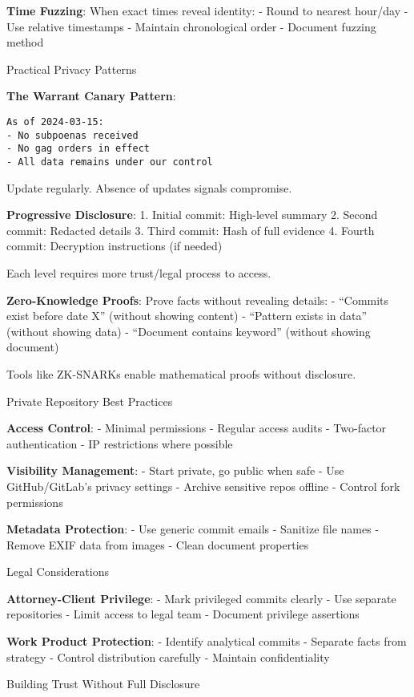 \textbf{Time Fuzzing}: When exact times reveal identity: - Round to
nearest hour/day - Use relative timestamps - Maintain chronological
order - Document fuzzing method

Practical Privacy Patterns

\textbf{The Warrant Canary Pattern}:

\begin{verbatim}
As of 2024-03-15:
- No subpoenas received
- No gag orders in effect  
- All data remains under our control
\end{verbatim}

Update regularly. Absence of updates signals compromise.

\textbf{Progressive Disclosure}: 1. Initial commit: High-level summary
2. Second commit: Redacted details 3. Third commit: Hash of full
evidence 4. Fourth commit: Decryption instructions (if needed)

Each level requires more trust/legal process to access.

\textbf{Zero-Knowledge Proofs}: Prove facts without revealing details: -
``Commits exist before date X'' (without showing content) - ``Pattern
exists in data'' (without showing data) - ``Document contains keyword''
(without showing document)

Tools like ZK-SNARKs enable mathematical proofs without disclosure.

Private Repository Best Practices

\textbf{Access Control}: - Minimal permissions - Regular access audits -
Two-factor authentication - IP restrictions where possible

\textbf{Visibility Management}: - Start private, go public when safe -
Use GitHub/GitLab's privacy settings - Archive sensitive repos offline -
Control fork permissions

\textbf{Metadata Protection}: - Use generic commit emails - Sanitize
file names - Remove EXIF data from images - Clean document properties

Legal Considerations

\textbf{Attorney-Client Privilege}: - Mark privileged commits clearly -
Use separate repositories - Limit access to legal team - Document
privilege assertions

\textbf{Work Product Protection}: - Identify analytical commits -
Separate facts from strategy - Control distribution carefully - Maintain
confidentiality

Building Trust Without Full Disclosure

